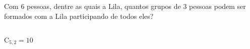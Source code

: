 \begin{ex}
Com 6 pessoas, dentre as quais a Lila, quantos grupos de 3 pessoas podem ser formados com a Lila participando de todos  eles?
  \begin{sol}
    \phantom{A}\\
    $\mathrm{C}_{5,2}=10$
  \end{sol}
\end{ex}
